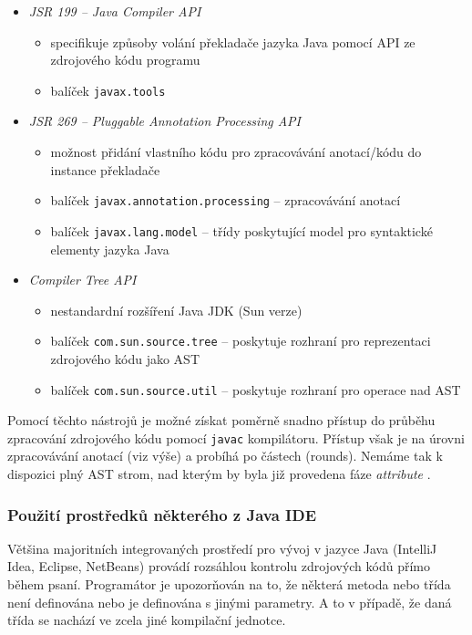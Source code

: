 \begin{itemize}
\item \emph{JSR 199 -- Java Compiler API}
  \begin{itemize}
  \item specifikuje způsoby volání překladače jazyka Java pomocí API ze zdrojového kódu programu
  \item balíček \verb+javax.tools+
  \end{itemize}
\item \emph{JSR 269 -- Pluggable Annotation Processing API}
  \begin{itemize}
  \item možnost přidání vlastního kódu pro zpracovávání anotací/kódu do instance překladače
  \item balíček \verb+javax.annotation.processing+ -- zpracovávání anotací
  \item balíček \verb+javax.lang.model+ -- třídy poskytující model pro syntaktické elementy jazyka Java
  \end{itemize}
\item \emph{Compiler Tree API} \cite{parsertools:compilertreeapi}
  \begin{itemize}
  \item nestandardní rozšíření Java JDK (Sun verze)
  \item balíček \verb+com.sun.source.tree+ -- poskytuje rozhraní pro reprezentaci zdrojového kódu jako AST
  \item balíček \verb+com.sun.source.util+ -- poskytuje rozhraní pro operace nad AST
  \end{itemize}
\end{itemize}

Pomocí těchto nástrojů je možné získat poměrně snadno přístup do průběhu zpracování zdrojového kódu pomocí \verb+javac+ kompilátoru. Přístup však je na úrovni zpracovávání anotací (viz výše) a probíhá po částech (rounds). Nemáme tak k dispozici plný AST strom, nad kterým by byla již provedena fáze \emph{attribute} \cite{hackers_guide_to_javac}.

\subsubsection{Použití prostředků některého z Java IDE}
Většina majoritních integrovaných prostředí pro vývoj v jazyce Java (IntelliJ Idea, Eclipse, NetBeans) provádí rozsáhlou kontrolu zdrojových kódů přímo během psaní. Programátor je upozorňován na to, že některá metoda nebo třída není definována nebo je definována s jinými parametry. A to v případě, že daná třída se nachází ve zcela jiné kompilační jednotce.

